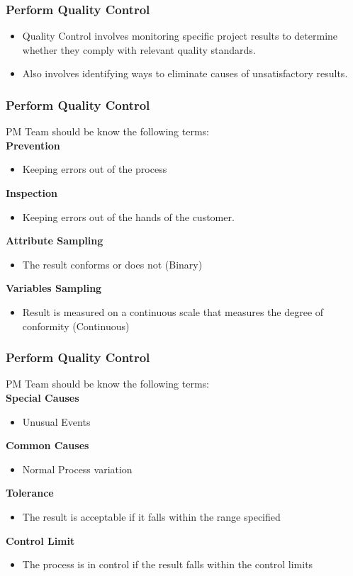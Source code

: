\begin{frame}
\frametitle{Perform Quality Control}
\begin{itemize}
	\item Quality Control involves monitoring specific project results to determine whether they comply with relevant quality standards.
	\item Also involves identifying ways to eliminate causes of unsatisfactory results.
\end{itemize}
\end{frame}




\begin{frame}
\frametitle{Perform Quality Control}
PM Team should be know the following terms:\\
\textbf{Prevention}
\begin{itemize}
	\item Keeping errors out of the process
\end{itemize}
\textbf{Inspection}
\begin{itemize}
	\item Keeping errors out of the hands of the customer.
\end{itemize}
\textbf{Attribute Sampling}
\begin{itemize}
	\item The result conforms or does not (Binary)
\end{itemize}
\textbf{Variables Sampling}
\begin{itemize}
	\item Result is measured on a continuous scale that measures the degree of conformity (Continuous)
\end{itemize}
\end{frame}




\begin{frame}
\frametitle{Perform Quality Control}
PM Team should be know the following terms:\\
\textbf{Special Causes}
\begin{itemize}
	\item Unusual Events
\end{itemize}
\textbf{Common Causes}
\begin{itemize}
	\item Normal Process variation
\end{itemize}
\textbf{Tolerance}
\begin{itemize}	
	\item The result is acceptable if it falls within the range specified
\end{itemize}
\textbf{Control Limit}
\begin{itemize}
	\item The process is in control if the result falls within the control limits
\end{itemize}
\end{frame}




